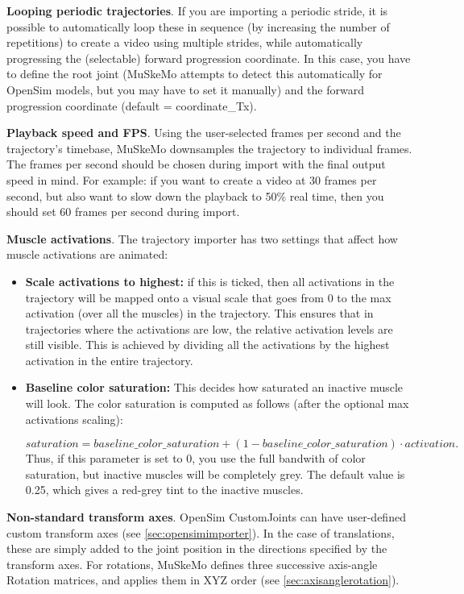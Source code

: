 \documentclass{article}
\begin{document}
\textbf{Looping periodic trajectories}. If you are importing a periodic stride, it is possible to automatically loop these in sequence (by increasing the number of repetitions) to create a video using multiple strides, while automatically progressing the (selectable) forward progression coordinate. In this case, you have to define the root joint (MuSkeMo attempts to detect this automatically for OpenSim models, but you may have to set it manually) and the forward progression coordinate (default = coordinate\_Tx).

\textbf{Playback speed and FPS}. Using the user-selected frames per second and the trajectory's timebase, MuSkeMo downsamples the trajectory to individual frames. The frames per second should be chosen during import with the final output speed in mind. For example: if you want to create a video at 30 frames per second, but also want to slow down the playback to 50\% real time, then you should set 60 frames per second during import.


\textbf{Muscle activations}. The trajectory importer has two settings that affect how muscle activations are animated:

\begin{itemize}
 \item \textbf{Scale activations to highest:} if this is ticked, then all activations in the trajectory will be mapped onto a visual scale that goes from 0 to the max activation (over all the muscles) in the trajectory. This ensures that in trajectories where the activations are low, the relative activation levels are still visible. This is achieved by dividing all the activations by the highest activation in the entire trajectory.
\item \textbf{Baseline color saturation:} This decides how saturated an inactive muscle will look. The color saturation is computed as follows (after the optional max activations scaling):

\begin{equation}
saturation = baseline\_color\_saturation + (1 - baseline\_color\_saturation) \cdot activation.
\end{equation}
Thus, if this parameter is set to 0, you use the full bandwith of color saturation, but inactive muscles will be completely grey. The default value is 0.25, which gives a red-grey tint to the inactive muscles.
\end{itemize}


\textbf{Non-standard transform axes}.
OpenSim CustomJoints can have user-defined custom transform axes (see \ref{sec:opensimimporter}). In the case of translations, these are simply added to the joint position in the directions specified by the transform axes. For rotations, MuSkeMo defines three successive axis-angle Rotation matrices, and applies them in XYZ order (see \ref{sec:axisanglerotation}).
\end{document}
